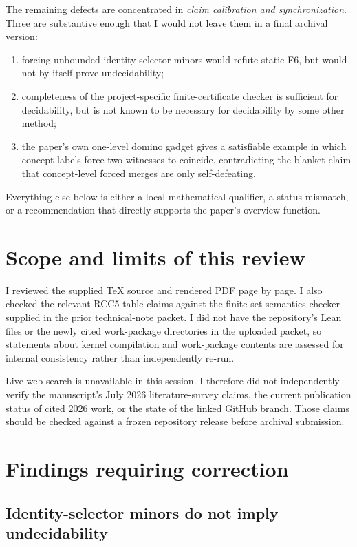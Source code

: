 \documentclass[11pt]{article}
\begin{document}
The remaining defects are concentrated in \emph{claim calibration and synchronization}. Three are substantive enough that I would not leave them in a final archival version:
\begin{enumerate}[leftmargin=2em]
  \item forcing unbounded identity-selector minors would refute static F6, but would not by itself prove undecidability;
  \item completeness of the project-specific finite-certificate checker is sufficient for decidability, but is not known to be necessary for decidability by some other method;
  \item the paper's own one-level domino gadget gives a satisfiable example in which concept labels force two witnesses to coincide, contradicting the blanket claim that concept-level forced merges are only self-defeating.
\end{enumerate}

Everything else below is either a local mathematical qualifier, a status mismatch, or a recommendation that directly supports the paper's overview function.

\section{Scope and limits of this review}

I reviewed the supplied \TeX{} source and rendered PDF page by page. I also checked the relevant RCC5 table claims against the finite set-semantics checker supplied in the prior technical-note packet. I did not have the repository's Lean files or the newly cited work-package directories in the uploaded packet, so statements about kernel compilation and work-package contents are assessed for internal consistency rather than independently re-run.

Live web search is unavailable in this session. I therefore did not independently verify the manuscript's July 2026 literature-survey claims, the current publication status of cited 2026 work, or the state of the linked GitHub branch. Those claims should be checked against a frozen repository release before archival submission.

\section{Findings requiring correction}

\subsection{Identity-selector minors do not imply undecidability}
\end{document}
